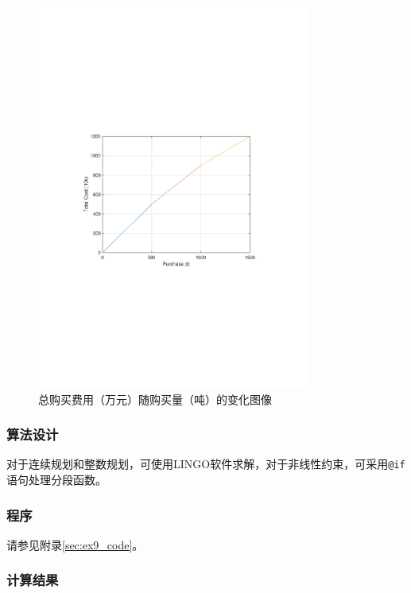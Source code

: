 \begin{figure}
    \centering
    \includegraphics[width=0.8\textwidth,trim={3.09cm 9.295cm 3.09cm 9.295cm},clip]{fig/ex9_cost.pdf}
    \caption{总购买费用（万元）随购买量（吨）的变化图像}
    \label{fig:ex9_cost}
\end{figure}

\subsubsection{算法设计}

对于连续规划和整数规划，可使用LINGO软件求解，对于非线性约束，可采用\texttt{@if}语句处理分段函数。

\subsubsection{程序}

请参见附录\ref{sec:ex9_code}。

\subsubsection{计算结果}

